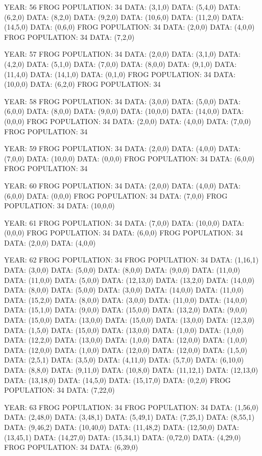 \documentclass[12pt,a4paper]{article}
\begin{document}
{YEAR: 56
FROG POPULATION: 34
DATA: (3,1,0)
DATA: (5,4,0)
DATA: (6,2,0)
DATA: (8,2,0)
DATA: (9,2,0)
DATA: (10,6,0)
DATA: (11,2,0)
DATA: (14,5,0)
DATA: (0,6,0)
FROG POPULATION: 34
DATA: (2,0,0)
DATA: (4,0,0)
FROG POPULATION: 34
DATA: (7,2,0)

YEAR: 57
FROG POPULATION: 34
DATA: (2,0,0)
DATA: (3,1,0)
DATA: (4,2,0)
DATA: (5,1,0)
DATA: (7,0,0)
DATA: (8,0,0)
DATA: (9,1,0)
DATA: (11,4,0)
DATA: (14,1,0)
DATA: (0,1,0)
FROG POPULATION: 34
DATA: (10,0,0)
DATA: (6,2,0)
FROG POPULATION: 34

YEAR: 58
FROG POPULATION: 34
DATA: (3,0,0)
DATA: (5,0,0)
DATA: (6,0,0)
DATA: (8,0,0)
DATA: (9,0,0)
DATA: (10,0,0)
DATA: (14,0,0)
DATA: (0,0,0)
FROG POPULATION: 34
DATA: (2,0,0)
DATA: (4,0,0)
DATA: (7,0,0)
FROG POPULATION: 34

YEAR: 59
FROG POPULATION: 34
DATA: (2,0,0)
DATA: (4,0,0)
DATA: (7,0,0)
DATA: (10,0,0)
DATA: (0,0,0)
FROG POPULATION: 34
DATA: (6,0,0)
FROG POPULATION: 34

YEAR: 60
FROG POPULATION: 34
DATA: (2,0,0)
DATA: (4,0,0)
DATA: (6,0,0)
DATA: (0,0,0)
FROG POPULATION: 34
DATA: (7,0,0)
FROG POPULATION: 34
DATA: (10,0,0)

YEAR: 61
FROG POPULATION: 34
DATA: (7,0,0)
DATA: (10,0,0)
DATA: (0,0,0)
FROG POPULATION: 34
DATA: (6,0,0)
FROG POPULATION: 34
DATA: (2,0,0)
DATA: (4,0,0)

YEAR: 62
FROG POPULATION: 34
FROG POPULATION: 34
DATA: (1,16,1)
DATA: (3,0,0)
DATA: (5,0,0)
DATA: (8,0,0)
DATA: (9,0,0)
DATA: (11,0,0)
DATA: (11,0,0)
DATA: (5,0,0)
DATA: (12,13,0)
DATA: (13,2,0)
DATA: (14,0,0)
DATA: (8,0,0)
DATA: (5,0,0)
DATA: (3,0,0)
DATA: (14,0,0)
DATA: (11,0,0)
DATA: (15,2,0)
DATA: (8,0,0)
DATA: (3,0,0)
DATA: (11,0,0)
DATA: (14,0,0)
DATA: (15,1,0)
DATA: (9,0,0)
DATA: (15,0,0)
DATA: (13,2,0)
DATA: (9,0,0)
DATA: (15,0,0)
DATA: (13,0,0)
DATA: (15,0,0)
DATA: (13,0,0)
DATA: (12,3,0)
DATA: (1,5,0)
DATA: (15,0,0)
DATA: (13,0,0)
DATA: (1,0,0)
DATA: (1,0,0)
DATA: (12,2,0)
DATA: (13,0,0)
DATA: (1,0,0)
DATA: (12,0,0)
DATA: (1,0,0)
DATA: (12,0,0)
DATA: (1,0,0)
DATA: (12,0,0)
DATA: (12,0,0)
DATA: (1,5,0)
DATA: (2,5,1)
DATA: (3,5,0)
DATA: (4,11,0)
DATA: (5,7,0)
DATA: (6,10,0)
DATA: (8,8,0)
DATA: (9,11,0)
DATA: (10,8,0)
DATA: (11,12,1)
DATA: (12,13,0)
DATA: (13,18,0)
DATA: (14,5,0)
DATA: (15,17,0)
DATA: (0,2,0)
FROG POPULATION: 34
DATA: (7,22,0)

YEAR: 63
FROG POPULATION: 34
FROG POPULATION: 34
DATA: (1,56,0)
DATA: (2,48,0)
DATA: (3,48,1)
DATA: (5,49,1)
DATA: (7,25,1)
DATA: (8,55,1)
DATA: (9,46,2)
DATA: (10,40,0)
DATA: (11,48,2)
DATA: (12,50,0)
DATA: (13,45,1)
DATA: (14,27,0)
DATA: (15,34,1)
DATA: (0,72,0)
DATA: (4,29,0)
FROG POPULATION: 34
DATA: (6,39,0)

}
\end{document}
